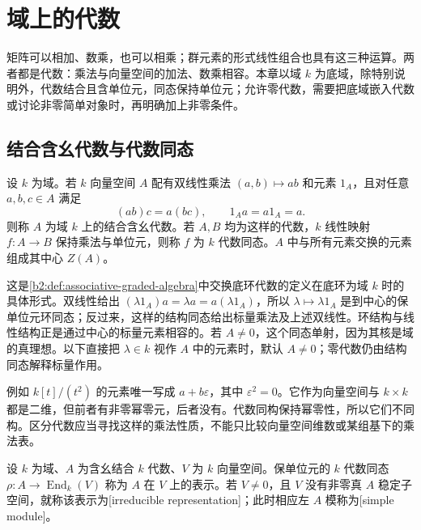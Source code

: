 
\section{域上的代数}
\label{b2:sec:1101}

矩阵可以相加、数乘，也可以相乘；群元素的形式线性组合也具有这三种运算。两者都是代数：乘法与向量空间的加法、数乘相容。本章以域 \(k\) 为底域，除特别说明外，代数结合且含单位元，同态保持单位元；允许零代数，需要把底域嵌入代数或讨论非零简单对象时，再明确加上非零条件。

%
%

\subsection{结合含幺代数与代数同态}
\label{b2:subsec:1101:01}

\begin{definition}\label{b2:def:field-algebra}
	设 \(k\) 为域。若 \(k\) 向量空间 \(A\) 配有双线性乘法 \((a,b)\mapsto ab\) 和元素 \(1_A\)，且对任意 \(a,b,c\in A\) 满足
	\[
		(ab)c=a(bc),\qquad 1_Aa=a1_A=a.
	\]
	则称 \(A\) 为域 \(k\) 上的结合含幺代数。若 \(A,B\) 均为这样的代数，\(k\) 线性映射 \(f:A\to B\) 保持乘法与单位元，则称 \(f\) 为 \(k\) 代数同态。\(A\) 中与所有元素交换的元素组成其中心 \(Z(A)\)。
\end{definition}

这是\cref{b2:def:associative-graded-algebra}中交换底环代数的定义在底环为域 \(k\) 时的具体形式。双线性给出 \((\lambda1_A)a=\lambda a=a(\lambda1_A)\)，所以 \(\lambda\mapsto\lambda1_A\) 是到中心的保单位元环同态；反过来，这样的结构同态给出标量乘法及上述双线性。环结构与线性结构正是通过中心的标量元素相容的。若 \(A\ne0\)，这个同态单射，因为其核是域的真理想。以下直接把 \(\lambda\in k\) 视作 \(A\) 中的元素时，默认 \(A\ne0\)；零代数仍由结构同态解释标量作用。

\ProseParagraphBreak
例如 \(k[t]/(t^2)\) 的元素唯一写成 \(a+b\varepsilon\)，其中 \(\varepsilon^2=0\)。它作为向量空间与 \(k\times k\) 都是二维，但前者有非零幂零元，后者没有。代数同构保持幂零性，所以它们不同构。区分代数应当寻找这样的乘法性质，不能只比较向量空间维数或某组基下的乘法表。

\begin{definition}\label{b2:def:algebra-representation}
	设 \(k\) 为域、\(A\) 为含幺结合 \(k\) 代数、\(V\) 为 \(k\) 向量空间。保单位元的 \(k\) 代数同态 \(\rho:A\to\operatorname{End}_k(V)\) 称为 \(A\) 在 \(V\) 上的表示。若 \(V\ne0\)，且 \(V\) 没有非零真 \(A\) 稳定子空间，就称该表示为[irreducible representation]；此时相应左 \(A\) 模称为[simple module]。
\end{definition}

